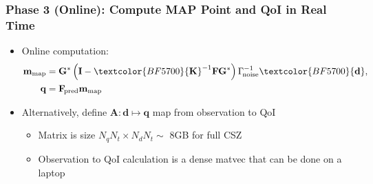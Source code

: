\begin{frame}
    \frametitle{Phase 3 (Online): Compute MAP Point and QoI in Real Time}
    \begin{itemize}
        \item Online computation:
        \[
        \begin{aligned}
        \mathbf{m}_{\text{map}} &= \mathbf{G}^*\left(\mathbf{I} - \textcolor{BF5700}{\mathbf{K}}^{-1}\mathbf{F}\mathbf{G}^*\right)\Gamma_{\!\text{noise}}^{-1}\textcolor{BF5700}{\mathbf{d}}, \\
        \mathbf{q} &= \mathbf{F}_{\!\text{pred}}\mathbf{m}_{\text{map}}
        \end{aligned}
        \]
        \item Alternatively, define \(\mathbf{A} : \mathbf{d} \mapsto \mathbf{q}\) map from observation to QoI
        \begin{itemize}
            \item Matrix is size \(N_qN_t \times N_dN_t \sim\) 8GB for full CSZ
            \item Observation to QoI calculation is a dense matvec that can be done on a laptop
        \end{itemize}
    \end{itemize}
\end{frame}
